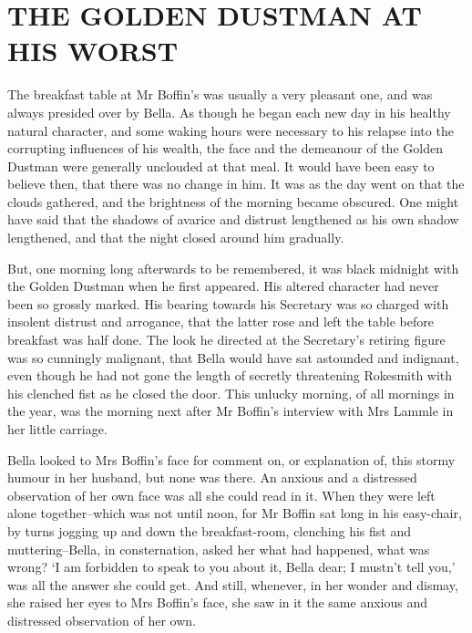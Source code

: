 
\chapter{THE GOLDEN DUSTMAN AT HIS WORST}

The breakfast table at Mr Boffin’s was usually a very pleasant one, and
was always presided over by Bella. As though he began each new day in
his healthy natural character, and some waking hours were necessary to
his relapse into the corrupting influences of his wealth, the face and
the demeanour of the Golden Dustman were generally unclouded at that
meal. It would have been easy to believe then, that there was no change
in him. It was as the day went on that the clouds gathered, and the
brightness of the morning became obscured. One might have said that the
shadows of avarice and distrust lengthened as his own shadow lengthened,
and that the night closed around him gradually.

But, one morning long afterwards to be remembered, it was black midnight
with the Golden Dustman when he first appeared. His altered character
had never been so grossly marked. His bearing towards his Secretary was
so charged with insolent distrust and arrogance, that the latter rose
and left the table before breakfast was half done. The look he directed
at the Secretary’s retiring figure was so cunningly malignant, that
Bella would have sat astounded and indignant, even though he had not
gone the length of secretly threatening Rokesmith with his clenched
fist as he closed the door. This unlucky morning, of all mornings in the
year, was the morning next after Mr Boffin’s interview with Mrs Lammle
in her little carriage.

Bella looked to Mrs Boffin’s face for comment on, or explanation of,
this stormy humour in her husband, but none was there. An anxious and
a distressed observation of her own face was all she could read in it.
When they were left alone together--which was not until noon, for Mr
Boffin sat long in his easy-chair, by turns jogging up and down
the breakfast-room, clenching his fist and muttering--Bella, in
consternation, asked her what had happened, what was wrong? ‘I am
forbidden to speak to you about it, Bella dear; I mustn’t tell you,’
was all the answer she could get. And still, whenever, in her wonder and
dismay, she raised her eyes to Mrs Boffin’s face, she saw in it the same
anxious and distressed observation of her own.

